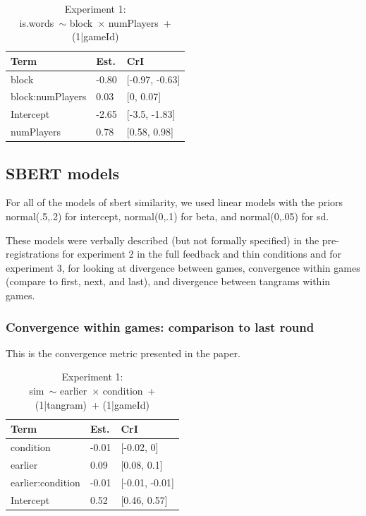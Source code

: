 \documentclass[
  english,
  a4paper,
]{article}
\begin{document}
\begin{table}[h!]

\caption{\label{tab:unnamed-chunk-14}Experiment 1:\\ is.words~$\sim$ block~$\times$ numPlayers~+ (1|gameId)}
\centering
\begin{tabular}[t]{lll}
\toprule
Term & Est. & CrI\\
\midrule
block & -0.80 & {}[-0.97, -0.63]\\
block:numPlayers & 0.03 & {}[0, 0.07]\\
Intercept & -2.65 & {}[-3.5, -1.83]\\
numPlayers & 0.78 & {}[0.58, 0.98]\\
\bottomrule
\end{tabular}
\end{table}
\pagebreak

\hypertarget{sbert-models}{%
\subsection{SBERT models}\label{sbert-models}}

For all of the models of sbert similarity, we used linear models with the priors normal(.5,.2) for intercept, normal(0,.1) for beta, and normal(0,.05) for sd.

These models were verbally described (but not formally specified) in the pre-registrations for experiment 2 in the full feedback and thin conditions and for experiment 3, for looking at divergence between games, convergence within games (compare to first, next, and last), and divergence between tangrams within games.

\hypertarget{convergence-within-games-comparison-to-last-round}{%
\subsubsection{Convergence within games: comparison to last round}\label{convergence-within-games-comparison-to-last-round}}

This is the convergence metric presented in the paper.

\begin{table}[h!]

\caption{\label{tab:unnamed-chunk-15}Experiment 1:\\ sim~$\sim$ earlier~$\times$ condition~+ (1|tangram)~+ (1|gameId)}
\centering
\begin{tabular}[t]{lll}
\toprule
Term & Est. & CrI\\
\midrule
condition & -0.01 & {}[-0.02, 0]\\
earlier & 0.09 & {}[0.08, 0.1]\\
earlier:condition & -0.01 & {}[-0.01, -0.01]\\
Intercept & 0.52 & {}[0.46, 0.57]\\
\bottomrule
\end{tabular}
\end{table}
\end{document}
